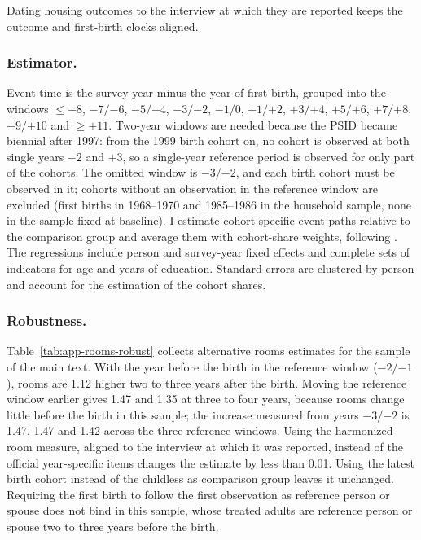 Dating housing outcomes to the interview at which they are reported keeps
the outcome and first-birth clocks aligned.

\subsubsection*{Estimator.}
Event time is the survey year minus the year of first birth, grouped into the
windows $\le-8$, $-7/{-6}$, $-5/{-4}$, $-3/{-2}$, $-1/0$, $+1/{+2}$,
$+3/{+4}$, $+5/{+6}$, $+7/{+8}$, $+9/{+10}$ and $\ge+11$. Two-year windows
are needed because the PSID became biennial after 1997: from the 1999 birth
cohort on, no cohort is observed at both single years $-2$ and $+3$, so a
single-year reference period is observed for only part of the cohorts. The
omitted window is $-3/{-2}$, and each birth cohort must be observed in it;
cohorts without an observation in the reference window are excluded (first
births in 1968--1970 and 1985--1986 in the household sample, none in the
sample fixed at baseline). I estimate cohort-specific event paths relative to
the comparison group and average them with cohort-share weights, following \citet{sunAbrahamDynamicEffects2021}. The regressions include person and survey-year fixed
effects and complete sets of indicators for age and years of education.
Standard errors are clustered by person and account for the estimation of the
cohort shares.

\subsubsection*{Robustness.}
Table~\ref{tab:app-rooms-robust} collects alternative rooms estimates for the
sample of the main text. With the year before the birth in the reference
window ($-2/{-1}$), rooms are 1.12 higher two to three years after the birth.
Moving the reference window earlier gives 1.47 and 1.35 at three to four
years, because rooms change little before the birth in this sample; the
increase measured from years $-3/{-2}$ is 1.47, 1.47 and 1.42 across the
three reference windows. Using the harmonized room measure, aligned to the
interview at which it was reported, instead of the official year-specific
items changes the estimate by less than 0.01. Using the latest birth cohort
instead of the childless as comparison group leaves it unchanged. Requiring
the first birth to follow the first observation as reference person or spouse
does not bind in this sample, whose treated adults are reference person or
spouse two to three years before the birth.

